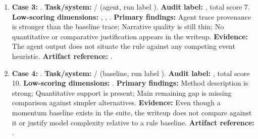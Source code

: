 \begin{enumerate}[leftmargin=*]
\item \textbf{Case 3:} . \textbf{Task/system:}  /  (agent, run label ). \textbf{Audit label:} , total score 7.
\textbf{Low-scoring dimensions:} , , . \textbf{Primary findings:} Agent trace provenance is stronger than the baseline trace; Narrative quality is still thin; No quantitative or comparative justification appears in the writeup. \textbf{Evidence:} The agent output does not situate the rule against any competing event heuristic.
\textbf{Artifact reference:} .

\item \textbf{Case 4:} . \textbf{Task/system:}  /  (baseline, run label ). \textbf{Audit label:} , total score 10.
\textbf{Low-scoring dimensions:} . \textbf{Primary findings:} Method description is strong; Quantitative support is present; Main remaining gap is missing comparison against simpler alternatives. \textbf{Evidence:} Even though a momentum baseline exists in the suite, the writeup does not compare against it or justify model complexity relative to a rule baseline.
\textbf{Artifact reference:} .

\end{enumerate}
\endgroup
